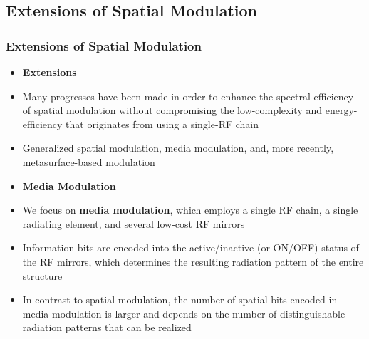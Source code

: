 \documentclass[9pt]{beamer}
\begin{document}
\subsection{Extensions of Spatial Modulation}
\begin{frame}
\frametitle{Extensions of Spatial Modulation}
\begin{itemize}
\item
{\bf Extensions}
\item
Many progresses have been made in order to enhance the spectral efficiency of spatial modulation without compromising the low-complexity and energy-efficiency that originates from using a single-RF chain
\item 
Generalized spatial modulation, media modulation, and, more recently, metasurface-based modulation
\item
{\bf Media Modulation}
\item
We focus on {\bf media modulation}, which employs a single RF chain, a single radiating element, and several low-cost RF mirrors
\item
Information bits are encoded into the active/inactive (or ON/OFF) status of the RF mirrors, which determines the resulting radiation pattern of the entire structure
\item
In contrast to spatial modulation, the number of spatial bits encoded in media modulation is larger and depends on the number of distinguishable radiation patterns that can be realized
\end{itemize}
\end{frame}
\end{document}
